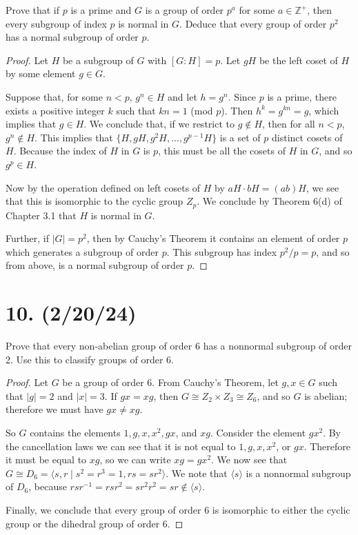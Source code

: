 \documentclass{article}
\begin{document}
Prove that if $p$ is a prime and $G$ is a group of order $p^a$ for some $a \in \mathbb{Z}^+$, then every subgroup of index $p$ is normal in $G$. Deduce that every group of order $p^2$ has a normal subgroup of order $p$.

\begin{proof}
    Let $H$ be a subgroup of $G$ with $[G:H] = p$. Let $gH$ be the left coset of $H$ by some element $g \in G$.
    
    Suppose that, for some $n < p$, $g^n \in H$ and let $h = g^n$. Since $p$ is a prime, there exists a positive integer $k$ such that $kn = 1$ (mod $p$). Then $h^k = g^{kn} = g$, which implies that $g \in H$. We conclude that, if we restrict to $g \notin H$, then for all $n < p$, $g^n \notin H$. This implies that $\{ H, gH, g^2 H, ..., g^{p - 1} H \}$ is a set of $p$ distinct cosets of $H$. Because the index of $H$ in $G$ is $p$, this must be all the cosets of $H$ in $G$, and so $g^p \in H$.

    Now by the operation defined on left cosets of $H$ by $aH \cdot bH = (ab)H$, we see that this is isomorphic to the cyclic group $Z_p$. We conclude by Theorem 6(d) of Chapter 3.1 that $H$ is normal in $G$.

    Further, if $|G| = p^2$, then by Cauchy's Theorem it contains an element of order $p$ which generates a subgroup of order $p$. This subgroup has index $p^2/p = p$, and so from above, is a normal subgroup of order $p$.
\end{proof}

\section*{10. (2/20/24)}

Prove that every non-abelian group of order 6 has a nonnormal subgroup of order 2. Use this to classify groups of order 6.

\begin{proof}
    Let $G$ be a group of order 6. From Cauchy's Theorem, let $g, x \in G$ such that $|g| = 2$ and $|x| = 3$. If $gx = xg$, then $G \cong Z_2 \times Z_3 \cong Z_6$, and so $G$ is abelian; therefore we must have $gx \neq xg$.
    
    So $G$ contains the elements $1, g, x, x^2, gx$, and $xg$. Consider the element $gx^2$. By the cancellation laws we can see that it is not equal to $1, g, x, x^2$, or $gx$. Therefore it must be equal to $xg$, so we can write $xg = gx^2$. We now see that $G \cong D_6 = \langle s, r \mid s^2 = r^3 = 1, rs = sr^2 \rangle$. We note that $\langle s \rangle$ is a nonnormal subgroup of $D_6$, because $rsr^{-1} = rsr^2 = sr^2 r^2 = sr \notin \langle s \rangle$.
    
    Finally, we conclude that every group of order 6 is isomorphic to either the cyclic group or the dihedral group of order 6.
\end{proof}
\end{document}
